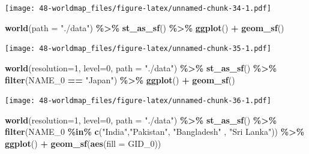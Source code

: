 \documentclass[
  xelatex, ja=standard]{bxjsbook}
\newenvironment{Shaded}{\begin{snugshade}}{\end{snugshade}}
\newcommand{\AttributeTok}[1]{\textcolor[rgb]{0.13,0.29,0.53}{#1}}
\newcommand{\DecValTok}[1]{\textcolor[rgb]{0.00,0.00,0.81}{#1}}
\newcommand{\FunctionTok}[1]{\textcolor[rgb]{0.13,0.29,0.53}{\textbf{#1}}}
\newcommand{\NormalTok}[1]{#1}
\newcommand{\SpecialCharTok}[1]{\textcolor[rgb]{0.81,0.36,0.00}{\textbf{#1}}}
\newcommand{\StringTok}[1]{\textcolor[rgb]{0.31,0.60,0.02}{#1}}
\theoremstyle{definition}
\theoremstyle{definition}
\theoremstyle{definition}
\theoremstyle{definition}
\theoremstyle{remark}
\begin{document}
\texttt{[image: 48-worldmap\_files/figure-latex/unnamed-chunk-34-1.pdf]}

\begin{Shaded}
\begin{Highlighting}[]
\FunctionTok{world}\NormalTok{(}\AttributeTok{path =} \StringTok{"./data"}\NormalTok{) }\SpecialCharTok{\%\textgreater{}\%}
  \FunctionTok{st\_as\_sf}\NormalTok{() }\SpecialCharTok{\%\textgreater{}\%} \FunctionTok{ggplot}\NormalTok{() }\SpecialCharTok{+} \FunctionTok{geom\_sf}\NormalTok{()}
\end{Highlighting}
\end{Shaded}

\texttt{[image: 48-worldmap\_files/figure-latex/unnamed-chunk-35-1.pdf]}

\begin{Shaded}
\begin{Highlighting}[]
\FunctionTok{world}\NormalTok{(}\AttributeTok{resolution=}\DecValTok{1}\NormalTok{, }\AttributeTok{level=}\DecValTok{0}\NormalTok{, }\AttributeTok{path =} \StringTok{"./data"}\NormalTok{) }\SpecialCharTok{\%\textgreater{}\%}
  \FunctionTok{st\_as\_sf}\NormalTok{() }\SpecialCharTok{\%\textgreater{}\%} \FunctionTok{filter}\NormalTok{(NAME\_0 }\SpecialCharTok{==} \StringTok{"Japan"}\NormalTok{) }\SpecialCharTok{\%\textgreater{}\%}
  \FunctionTok{ggplot}\NormalTok{() }\SpecialCharTok{+} \FunctionTok{geom\_sf}\NormalTok{()}
\end{Highlighting}
\end{Shaded}

\texttt{[image: 48-worldmap\_files/figure-latex/unnamed-chunk-36-1.pdf]}

\begin{Shaded}
\begin{Highlighting}[]
\FunctionTok{world}\NormalTok{(}\AttributeTok{resolution=}\DecValTok{1}\NormalTok{, }\AttributeTok{level=}\DecValTok{0}\NormalTok{, }\AttributeTok{path =} \StringTok{"./data"}\NormalTok{) }\SpecialCharTok{\%\textgreater{}\%}
  \FunctionTok{st\_as\_sf}\NormalTok{() }\SpecialCharTok{\%\textgreater{}\%} \FunctionTok{filter}\NormalTok{(NAME\_0 }\SpecialCharTok{\%in\%} \FunctionTok{c}\NormalTok{(}\StringTok{"India"}\NormalTok{,}\StringTok{"Pakistan"}\NormalTok{, }\StringTok{"Bangladesh"}\NormalTok{ , }\StringTok{"Sri Lanka"}\NormalTok{)) }\SpecialCharTok{\%\textgreater{}\%}
  \FunctionTok{ggplot}\NormalTok{() }\SpecialCharTok{+} \FunctionTok{geom\_sf}\NormalTok{(}\FunctionTok{aes}\NormalTok{(}\AttributeTok{fill =}\NormalTok{ GID\_0))}
\end{Highlighting}
\end{Shaded}
\end{document}
